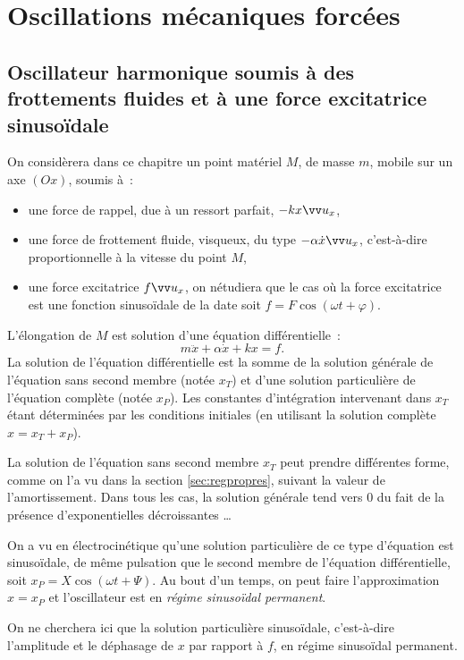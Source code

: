 \chapter{Oscillations mécaniques forcées}
\minitoc
\minilof
\minilot

\section{Oscillateur harmonique soumis à des frottements fluides et à une force excitatrice sinusoïdale}
On considèrera dans ce chapitre un point matériel \(M\), de masse \(m\), mobile sur un axe \((Ox)\), soumis à~:
\begin{itemize}
    \item une force de rappel, due à un ressort parfait, \(-kx \ux\),
    \item une force de frottement fluide, visqueux, du type \(-\alpha \dot{x} \ux\), c'est-à-dire proportionnelle à la vitesse du point \(M\),
    \item une force excitatrice \(f \ux\), on nétudiera que le cas où la force excitatrice est une fonction sinusoïdale de la date soit \(f = F\cos(\omega t + \varphi)\).
\end{itemize}
L'élongation de \(M\) est solution d'une équation différentielle~:
\begin{equation}
    m\ddot{x}+\alpha\dot{x}+kx = f.
\end{equation}
La solution de l'équation différentielle est la somme de la solution générale de l'équation sans second membre (notée \(x_T\)) et d'une solution particulière de l'équation complète (notée \(x_P\)). Les constantes d'intégration intervenant dans \(x_T\) étant déterminées par les conditions initiales (en utilisant la solution complète \(x = x_T+x_P\)). 

La solution de l'équation sans second membre \(x_T\) peut prendre différentes forme, comme on l'a vu dans la section \ref{sec:regpropres}, suivant la valeur de l'amortissement. Dans tous les cas, la solution générale tend vers 0 du fait de la présence d'exponentielles décroissantes \ldots

On a vu en électrocinétique qu'une solution particulière de ce type d'équation est sinusoïdale, de même pulsation que le second membre de l'équation différentielle, soit \(x_P = X\cos(\omega t + \Psi)\). Au bout d'un temps, on peut faire l'approximation \(x = x_P\) et l'oscillateur est en \emph{régime sinusoïdal permanent}. 

On ne cherchera ici que la solution particulière sinusoïdale, c'est-à-dire l'amplitude et le déphasage de \(x\) par rapport à \(f\), en régime sinusoïdal permanent.

